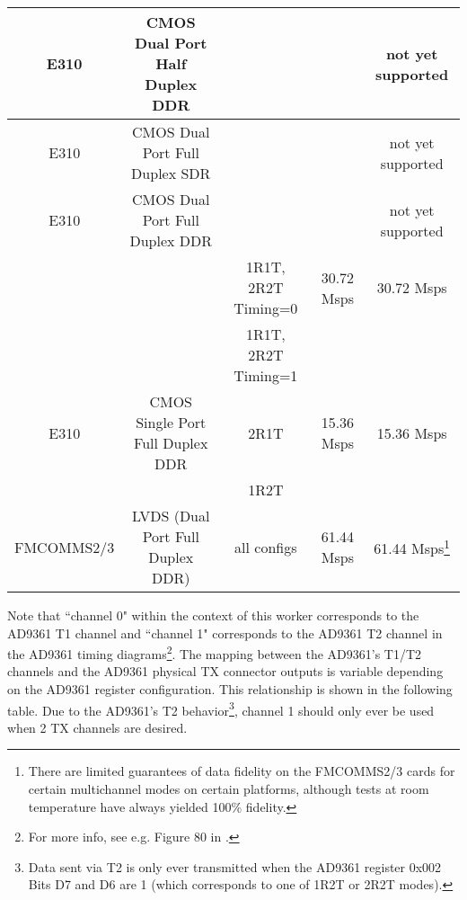 \documentclass{article}
\begin{document}
\begin{sloppypar}
\begin{scriptsize}
\begin{longtable}{|c|c|c|c|c|}
    \hline
    E310 & CMOS Dual   Port Half Duplex DDR &                   & & not yet supported \\
    \hline
    E310 & CMOS Dual   Port Full Duplex SDR &                   & & not yet supported  \\
    \hline
    E310 & CMOS Dual   Port Full Duplex DDR &                   & & not yet supported  \\
    \hline
         &                           & 1R1T, 2R2T Timing=0 & 30.72 Msps & 30.72 Msps \\
    \cline{2-5}
         &                           & 1R1T, 2R2T Timing=1 &            &            \\
    E310 & CMOS Single Port Full Duplex DDR & 2R1T                & 15.36 Msps & 15.36 Msps \\
         &                           & 1R2T                &            &            \\
    \hline
    FMCOMMS2/3 & LVDS (Dual Port Full Duplex DDR) & all configs         & 61.44 Msps & 61.44 Msps\footnote{There are limited guarantees of data fidelity on the FMCOMMS2/3 cards for certain multichannel modes on certain platforms, although tests at room temperature have always yielded 100\% fidelity.} \\
    \hline
	\end{longtable}
\end{scriptsize}
\pagebreak
Note that ``channel 0" within the context of this worker corresponds to the AD9361 T1 channel and ``channel 1" corresponds to the AD9361 T2 channel in the AD9361 timing diagrams\footnote{For more info, see e.g. Figure 80 in \cite{adi_ug570}.}. The mapping between the AD9361's T1/T2 channels and the AD9361 physical TX connector outputs is variable depending on the AD9361 register configuration. This relationship is shown in the following table.  Due to the AD9361's T2 behavior\footnote{\label{t2}Data sent via T2 is only ever transmitted when the AD9361 register 0x002 Bits D7 and D6 are 1 (which corresponds to one of 1R2T or 2R2T modes).}, channel 1 should only ever be used when 2 TX channels are desired.
\end{sloppypar}
\end{document}
